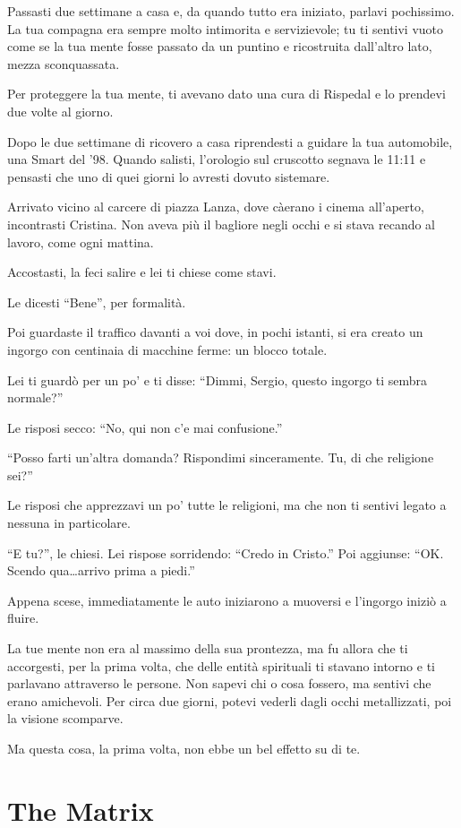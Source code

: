 Passasti due settimane a casa e, da quando tutto era iniziato, parlavi pochissimo. La tua compagna era sempre molto intimorita e servizievole; tu ti sentivi vuoto come se la tua mente fosse passato da un puntino e ricostruita dall'altro lato, mezza sconquassata.

Per proteggere la tua mente, ti avevano dato una cura di Rispedal e lo prendevi due volte al giorno.

Dopo le due settimane di ricovero a casa riprendesti a guidare la tua automobile, una Smart del '98. Quando salisti, l'orologio sul cruscotto segnava le 11:11 e pensasti che uno di quei giorni lo avresti dovuto sistemare.

Arrivato vicino al carcere di piazza Lanza, dove càerano i cinema all'aperto, incontrasti Cristina. Non aveva più il bagliore negli occhi e si stava recando al lavoro, come ogni mattina.

Accostasti, la feci salire e lei ti chiese come stavi.

Le dicesti “Bene”, per formalità.

Poi guardaste il traffico davanti a voi dove, in pochi istanti, si era creato un ingorgo con centinaia di macchine ferme: un blocco totale.

Lei ti guardò per un po' e ti disse: “Dimmi, Sergio, questo ingorgo ti sembra normale?”

Le risposi secco: “No, qui non c'e mai confusione.”

“Posso farti un'altra domanda? Rispondimi sin\-ce\-ra\-mente. Tu, di che religione sei?”

Le risposi che apprezzavi un po' tutte le religioni, ma che non ti sentivi legato a nessuna in particolare.

“E tu?”, le chiesi. Lei rispose sorridendo: “Credo in Cristo.” Poi aggiunse: “OK. Scendo qua\ldots arrivo prima a piedi.”

Appena scese, immediatamente le auto iniziarono a muoversi e l'ingorgo iniziò a fluire.

La tue mente non era al massimo della sua prontezza, ma fu allora che ti accorgesti, per la prima volta, che delle entità spirituali ti stavano intorno e ti parlavano attraverso le persone. Non sapevi chi o cosa fossero, ma sentivi che erano amichevoli. Per circa due giorni, potevi vederli dagli occhi metallizzati, poi la visione scomparve.

Ma questa cosa, la prima volta, non ebbe un bel effetto su di te.

\section{The Matrix}
\label{the_matrix}

